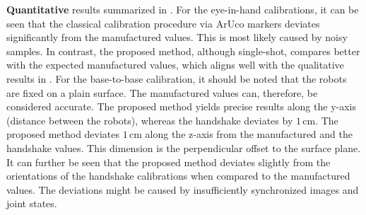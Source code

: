 \textbf{Quantitative} results summarized in . For the eye-in-hand calibrations, it can be seen that the classical calibration procedure via ArUco markers deviates significantly from the manufactured values. This is most likely caused by noisy samples. In contrast, the proposed method, although single-shot, compares better with the expected manufactured values, which aligns well with the qualitative results in . For the base-to-base calibration, it should be noted that the robots are fixed on a plain surface. The manufactured values can, therefore, be considered accurate. The proposed method yields precise results along the y-axis (distance between the robots), whereas the handshake deviates by $1\,\text{cm}$. The proposed method deviates $1\,\text{cm}$ along the z-axis from the manufactured and the handshake values. This dimension is the perpendicular offset to the surface plane. It can further be seen that the proposed method deviates slightly from the orientations of the handshake calibrations when compared to the manufactured values. The deviations might be caused by insufficiently synchronized images and joint states.


